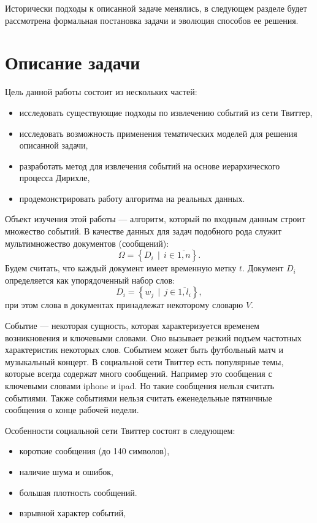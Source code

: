 \documentclass[12pt, a4paper]{article}
\DeclareMathOperator{\svert}{\,\vert\,}
\begin{document}
	Исторически подходы к описанной задаче менялись, в следующем разделе будет рассмотрена формальная постановка задачи и эволюция способов ее решения.
	
  \section{Описание задачи}
	Цель данной работы состоит из нескольких частей:
\begin{itemize}
\item исследовать существующие подходы по извлечению событий из сети Твиттер,
\item исследовать возможность применения тематических моделей для решения описанной задачи,
\item разработать метод для извлечения событий на основе иерархического процесса Дирихле,
\item продемонстрировать работу алгоритма на реальных данных.
\end{itemize}	  
  
  Объект изучения этой работы --- алгоритм, который по входным данным строит множество событий. В качестве данных для задач подобного рода служит мультимножество документов (сообщений):
\begin{equation}
  \Omega = \left\{D_i \svert i \in \overline{1,n} \right\}.
  \end{equation}  
  Будем считать, что каждый документ имеет временную метку $t$. Документ $D_i$ определяется как упорядоченный набор слов:
\begin{equation}
  D_i = \left\{w_j \svert j \in \overline{ 1, l_i } \right\},
  \end{equation}  
   при этом слова в документах принадлежат некоторому словарю $V$. 
  
  Событие --- некоторая сущность, которая характеризуется временем возникновения и ключевыми словами. Оно вызывает резкий подъем частотных характеристик некоторых слов. Событием может быть футбольный матч и музыкальный концерт. В социальной сети Твиттер есть популярные темы, которые всегда содержат много сообщений. Например это сообщения с ключевыми словами iphone и ipad. Но такие сообщения нельзя считать событиями. Также событиями нельзя считать еженедельные пятничные сообщения о конце рабочей недели\cite{waim13}.
  
  Особенности социальной сети Твиттер состоят в следующем:
  \begin{itemize}
  \item короткие сообщения (до 140 символов),
  \item наличие шума и ошибок,
  \item большая плотность сообщений.
  \item взрывной характер событий,
  \end{itemize}
  
\end{document}
